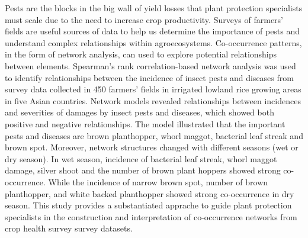 \documentclass[12pt,a4paper]{article}
\begin{document}
Pests are the blocks in the big wall of yield losses that plant protection specialists must scale due to the need to increase crop productivity. Surveys of farmers' fields are useful sources of data to help us determine the importance of pests and understand complex relationships within agroecosystems. Co-occurrence patterns, in the form of network analysis, can used to explore potential relationships between elements. Spearman's rank correlation-based network analysis was used to identify relationships between the incidence of insect pests and diseases from survey data collected in 450 farmers' fields in irrigated lowland rice growing areas in five Asian countries. Network models revealed relationships between incidences and severities of damages by insect pests and diseases, which showed both positive and negative relationships. The model illustrated that the important pests and diseases are brown planthopper, whorl maggot, bacterial leaf streak and brown spot. Moreover, network structures changed with different seasons (wet or dry season). In wet season, incidence of bacterial leaf streak, whorl maggot damage, silver shoot and the number of brown plant hoppers showed strong co-occurrence. While the incidence of narrow brown spot, number of brown planthopper, and white backed planthopper showed strong co-occurrence in dry season. This study provides a substantiated apprache to guide plant protection specialists in the construction and interpretation of co-occurrence networks from crop health survey survey datasets.
 
\end{document}
